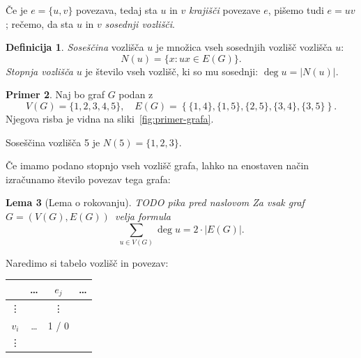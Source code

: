 \documentclass[12pt,a4paper]{amsart}
\theoremstyle{definition} %
\newtheorem{definicija}{Definicija}[section]
\newtheorem{primer}[definicija]{Primer}
\theoremstyle{plain} %
\newtheorem{lema}[definicija]{Lema}
\newcommand{\graf}[1][G]{\ensuremath{#1 = (V(#1), E(#1))}}
\newcommand{\vozlisca}[1][G]{\ensuremath{V(#1)}}
\newcommand{\povezave}[1][G]{\ensuremath{E(#1)}}
\DeclareMathOperator {\stopnja} {deg}
\begin{document}
Če je $e = \{ u,v \}$ povezava, tedaj sta $u$ in $v$ \emph{krajišči} povezave $e$, pišemo tudi $e = uv$; rečemo, da sta $u$ in $v$ \emph{sosednji vozlišči}.

\begin{definicija}
	\emph{Soseščina} vozlišča $u$ je množica vseh sosednjih vozlišč vozlišča $u$:
	\[ N(u) = \{ x\colon ux \in \povezave \} .\]
	\emph{Stopnja vozlišča} $u$ je število vseh vozlišč, ki so mu sosednji: $\stopnja u = |N(u)|$.
\end{definicija}

\begin{primer}
    \label{primer:sosedi}
    Naj bo graf $G$ podan z \[\vozlisca = \{ 1,2,3,4,5 \}, \quad \povezave = \left\{ \{1,4\},\{1,5\},\{2,5\},\{3,4\},\{3,5\} \right\}.\]
    Njegova risba je vidna na sliki~\ref{fig:primer-grafa}.
    \begin{center}
        \bigskip
        \label{fig:primer-grafa}
        \bigskip
    \end{center}
    Soseščina vozlišča 5 je $N(5) = \{1,2,3\}$.
\end{primer}
\medskip

Če imamo podano stopnjo vseh vozlišč grafa, lahko na enostaven način izračunamo število povezav tega grafa:

\begin{lema}[Lema o rokovanju]
    TODO pika pred naslovom
    \label{lema:rokovanje}
    Za vsak graf \graf~velja formula
    \begin{equation}
        \sum_{u \in V(G)}\! \stopnja u = 2 \cdot |E(G)|.
        \label{eq:lema-o-rokovanju}
    \end{equation}
\end{lema}

\proof
    Naredimo si tabelo vozlišč in povezav:
    
    \begin{table}[h]
        \centering
        \begin{tabular}{c|ccc}
            & \ldots & $e_j$ & \ldots \\ \hline
            \vdots & & \vdots & \\
            $v_i$ & \ldots & 1 / 0 & \\
            \vdots & & &
        \end{tabular}
    \end{table}
    
\end{document}
